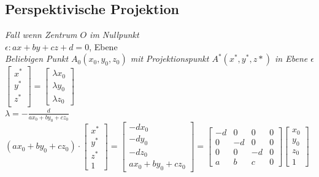 \subsection{Perspektivische Projektion}

\textit{Fall wenn Zentrum $O$ im Nullpunkt} \\

$\epsilon: ax + by + cz + d = 0$, Ebene \\

\textit{Beliebigen Punkt $A_0(x_0,y_0,z_0)$ mit Projektionspunkt $A^*(x^*,y^*,z*)$ in Ebene $\epsilon$} \\

$\begin{bmatrix}
    x^* \\
    y^* \\
    z^* \\
\end{bmatrix} = \begin{bmatrix}
    \lambda x_0 \\
    \lambda y_0 \\
    \lambda z_0
\end{bmatrix}$ \\

$\lambda = -\frac{d}{ax_0 + by_0 + cz_0}$ \\

$(ax_0 + by_0 + cz_0) \cdot \begin{bmatrix}
    x^* \\
    y^* \\
    z^* \\
    1
\end{bmatrix} = \begin{bmatrix}
    -dx_0 \\
    -dy_0 \\
    -dz_0 \\
    ax_0 + by_0 + cz_0
\end{bmatrix} = \begin{bmatrix}
    -d & 0 & 0 & 0 \\
    0 & -d & 0 & 0 \\
    0 & 0 & -d & 0 \\
    a & b & c & 0
\end{bmatrix} \begin{bmatrix}
    x_0 \\
    y_0 \\
    z_0 \\
    1
\end{bmatrix}$ \\

